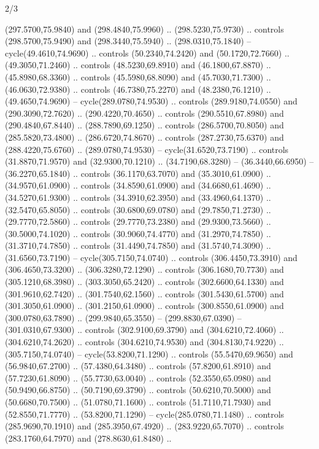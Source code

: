 \begin{flagdescription}{2/3}
\begin{scope}[xshift=0.5\flaglength,yshift=0.5\flagwidth,scale=\stretchfactor]
\begin{scope}[scale=0.001645\flagwidth,yshift=65mm,xshift=-63mm]
\begin{scope}[y=0.80pt, x=0.80pt, yscale=-1,]
\begin{scope}[cm={{1.33333,0.0,0.0,1.33333,(0.0,1e-05)}}]
  (297.5700,75.9840) and (298.4840,75.9960) .. (298.5230,75.9730) .. controls
  (298.5700,75.9490) and (298.3440,75.5940) .. (298.0310,75.1840) --
  cycle(49.4610,74.9690) .. controls (50.2340,74.2420) and (50.1720,72.7660) ..
  (49.3050,71.2460) .. controls (48.5230,69.8910) and (46.1800,67.8870) ..
  (45.8980,68.3360) .. controls (45.5980,68.8090) and (45.7030,71.7300) ..
  (46.0630,72.9380) .. controls (46.7380,75.2270) and (48.2380,76.1210) ..
  (49.4650,74.9690) -- cycle(289.0780,74.9530) .. controls (289.9180,74.0550)
  and (290.3090,72.7620) .. (290.4220,70.4650) .. controls (290.5510,67.8980)
  and (290.4840,67.8440) .. (288.7890,69.1250) .. controls (286.5700,70.8050)
  and (285.5820,73.4800) .. (286.6720,74.8670) .. controls (287.2730,75.6370)
  and (288.4220,75.6760) .. (289.0780,74.9530) -- cycle(31.6520,73.7190) ..
  controls (31.8870,71.9570) and (32.9300,70.1210) .. (34.7190,68.3280) --
  (36.3440,66.6950) -- (36.2270,65.1840) .. controls (36.1170,63.7070) and
  (35.3010,61.0900) .. (34.9570,61.0900) .. controls (34.8590,61.0900) and
  (34.6680,61.4690) .. (34.5270,61.9300) .. controls (34.3910,62.3950) and
  (33.4960,64.1370) .. (32.5470,65.8050) .. controls (30.6800,69.0780) and
  (29.7850,71.2730) .. (29.7770,72.5860) .. controls (29.7770,73.2380) and
  (29.9300,73.5660) .. (30.5000,74.1020) .. controls (30.9060,74.4770) and
  (31.2970,74.7850) .. (31.3710,74.7850) .. controls (31.4490,74.7850) and
  (31.5740,74.3090) .. (31.6560,73.7190) -- cycle(305.7150,74.0740) .. controls
  (306.4450,73.3910) and (306.4650,73.3200) .. (306.3280,72.1290) .. controls
  (306.1680,70.7730) and (305.1210,68.3980) .. (303.3050,65.2420) .. controls
  (302.6600,64.1330) and (301.9610,62.7420) .. (301.7540,62.1560) .. controls
  (301.5430,61.5700) and (301.3050,61.0900) .. (301.2150,61.0900) .. controls
  (300.8550,61.0900) and (300.0780,63.7890) .. (299.9840,65.3550) --
  (299.8830,67.0390) -- (301.0310,67.9300) .. controls (302.9100,69.3790) and
  (304.6210,72.4060) .. (304.6210,74.2620) .. controls (304.6210,74.9530) and
  (304.8130,74.9220) .. (305.7150,74.0740) -- cycle(53.8200,71.1290) .. controls
  (55.5470,69.9650) and (56.9840,67.2700) .. (57.4380,64.3480) .. controls
  (57.8200,61.8910) and (57.7230,61.8090) .. (55.7730,63.0040) .. controls
  (52.3550,65.0980) and (50.9490,66.8750) .. (50.7190,69.3790) .. controls
  (50.6210,70.5000) and (50.6680,70.7500) .. (51.0780,71.1600) .. controls
  (51.7110,71.7930) and (52.8550,71.7770) .. (53.8200,71.1290) --
  cycle(285.0780,71.1480) .. controls (285.9690,70.1910) and (285.3950,67.4920)
  .. (283.9220,65.7070) .. controls (283.1760,64.7970) and (278.8630,61.8480) ..

\end{scope}
\end{scope}
\end{scope}
\end{scope}
\end{flagdescription}
